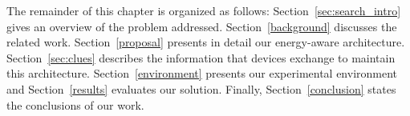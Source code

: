 


The remainder of this chapter is organized as follows:
Section~\ref{sec:search_intro} gives an overview of the problem addressed.
Section~\ref{background} discusses the related work.
Section~\ref{proposal} presents in detail our energy-aware architecture.
Section~\ref{sec:clues} describes the information that devices exchange to maintain this architecture.
Section~\ref{environment} presents our experimental environment and Section~\ref{results} evaluates our solution.
Finally, Section~\ref{conclusion} states the conclusions of our work.












